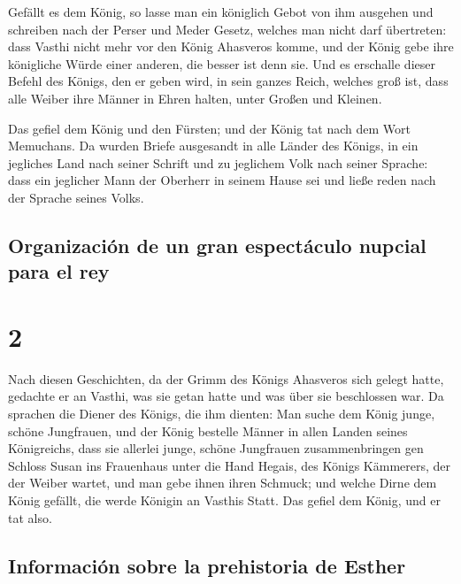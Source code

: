  Gefällt es dem König, so lasse man ein königlich Gebot
von ihm ausgehen und schreiben nach der Perser und Meder Gesetz, welches
man nicht darf übertreten: dass Vasthi nicht mehr vor den König
Ahasveros komme, und der König gebe ihre königliche Würde einer anderen,
die besser ist denn sie.  Und es erschalle dieser Befehl
des Königs, den er geben wird, in sein ganzes Reich, welches groß ist,
dass alle Weiber ihre Männer in Ehren halten, unter Großen und Kleinen.

 Das gefiel dem König und den Fürsten; und der König tat
nach dem Wort Memuchans.  Da wurden Briefe ausgesandt in
alle Länder des Königs, in ein jegliches Land nach seiner Schrift und zu
jeglichem Volk nach seiner Sprache: dass ein jeglicher Mann der Oberherr
in seinem Hause sei und ließe reden nach der Sprache seines Volks.

\hypertarget{organizaciuxf3n-de-un-gran-espectuxe1culo-nupcial-para-el-rey}{%
\subsection{Organización de un gran espectáculo nupcial para el
rey}\label{organizaciuxf3n-de-un-gran-espectuxe1culo-nupcial-para-el-rey}}

\hypertarget{section-1}{%
\section{2}\label{section-1}}

 Nach diesen Geschichten, da der Grimm des Königs
Ahasveros sich gelegt hatte, gedachte er an Vasthi, was sie getan hatte
und was über sie beschlossen war.  Da sprachen die Diener
des Königs, die ihm dienten: Man suche dem König junge, schöne
Jungfrauen,  und der König bestelle Männer in allen Landen
seines Königreichs, dass sie allerlei junge, schöne Jungfrauen
zusammenbringen gen Schloss Susan ins Frauenhaus unter die Hand Hegais,
des Königs Kämmerers, der der Weiber wartet, und man gebe ihnen ihren
Schmuck;  und welche Dirne dem König gefällt, die werde
Königin an Vasthis Statt. Das gefiel dem König, und er tat also.

\hypertarget{informaciuxf3n-sobre-la-prehistoria-de-esther}{%
\subsection{Información sobre la prehistoria de
Esther}\label{informaciuxf3n-sobre-la-prehistoria-de-esther}}

